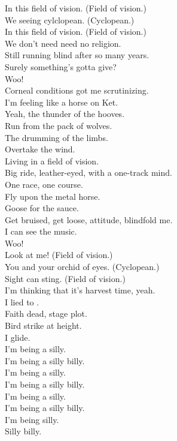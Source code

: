 In this field of vision. (Field of vision.) \\
We seeing cylclopean. (Cyclopean.) \\
In this field of vision. (Field of vision.) \\
We don't need need no religion. \\

Still running blind after so many years. \\
Surely something's gotta give? \\
Woo! \\
Corneal conditions got me scrutinizing. \\
I'm feeling like a horse on Ket. \\
Yeah, the thunder of the hooves. \\
Run from the pack of wolves. \\
The drumming of the limbs. \\
Overtake the wind. \\
Living in a field of vision. \\

Big ride, leather-eyed, with a one-track mind. \\
One race, one course. \\
Fly upon the metal horse. \\
Goose for the sauce. \\
Get bruised, get loose, attitude, blindfold me. \\
I can see the music. \\
Woo! \\

Look at me! (Field of vision.) \\
You and your orchid of eyes. (Cyclopean.) \\
Sight can sting. (Field of vision.) \\
I'm thinking that it's harvest time, yeah. \\

I lied to . \\
Faith dead, stage plot. \\
Bird strike at height. \\
I glide. \\

I'm being a silly. \\
I'm being a silly billy. \\
I'm being a silly. \\
I'm being a silly billy. \\
I'm being a silly. \\
I'm being a silly billy. \\
I'm being silly. \\
Silly billy. \\

